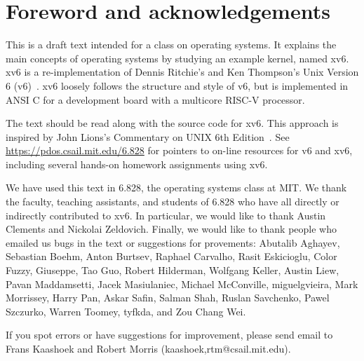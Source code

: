 \chapter*{Foreword and acknowledgements}


This is a draft text intended for a class on operating systems. It
explains the main concepts of operating systems by studying an example
kernel, named xv6.  xv6 is a re-implementation of Dennis Ritchie's and
Ken Thompson's Unix Version 6 (v6)~\cite{unix}.  xv6 loosely follows the structure
and style of v6, but is implemented in ANSI C for a development board
with a multicore RISC-V processor.

The text should be read along with the source code for xv6. This approach is
inspired by John Lions's Commentary on UNIX 6th Edition~\cite{lions}. See
\url{https://pdos.csail.mit.edu/6.828} for pointers to on-line
resources for v6 and xv6, including several hands-on homework assignments
using xv6.

We have used this text in 6.828, the operating systems class at MIT.  We thank
the faculty, teaching assistants, and students of 6.828 who have all directly or
indirectly contributed to xv6.  In particular, we would like to thank Austin
Clements and Nickolai Zeldovich.  Finally, we would like to thank people who
emailed us bugs in the text or suggestions for provements: Abutalib Aghayev,
Sebastian Boehm, Anton Burtsev, Raphael Carvalho, Rasit Eskicioglu, Color Fuzzy,
Giuseppe, Tao Guo, Robert Hilderman, Wolfgang Keller, Austin Liew, Pavan
Maddamsetti, Jacek Masiulaniec, Michael McConville, miguelgvieira, Mark
Morrissey, Harry Pan, Askar Safin, Salman Shah, Ruslan Savchenko, Pawel
Szczurko, Warren Toomey, tyfkda, and Zou Chang Wei.

If you spot errors or have suggestions for improvement, please send email to
Frans Kaashoek and Robert Morris (kaashoek,rtm@csail.mit.edu).
